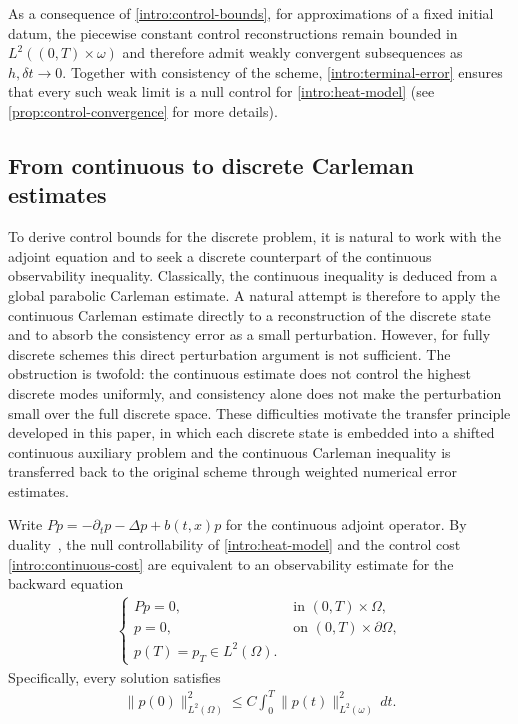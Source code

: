 \documentclass[print,wide,eng]{draft}
\begin{document}
As a consequence of \cref{intro:control-bounds}, for approximations of a fixed initial datum, the piecewise constant control reconstructions remain bounded in $L^2((0,T)\times\omega)$ and therefore admit weakly convergent subsequences as $h,\delta t\to0$.
Together with consistency of the scheme, \cref{intro:terminal-error} ensures that every such weak limit is a null control for \cref{intro:heat-model} (see \cref{prop:control-convergence} for more details).



\subsection{From continuous to discrete Carleman estimates}\label{intro:transfer}

To derive control bounds for the discrete problem, it is natural to work with the adjoint equation and to seek a discrete counterpart of the continuous observability inequality. Classically, the continuous inequality is deduced from a global parabolic Carleman estimate. A natural attempt is therefore to apply the continuous Carleman estimate directly to a reconstruction of the discrete state and to absorb the consistency error as a small perturbation. However, for fully discrete schemes this direct perturbation argument is not sufficient. The obstruction is twofold: the continuous estimate does not control the highest discrete modes uniformly, and consistency alone does not make the perturbation small over the full discrete space. These difficulties motivate the transfer principle developed in this paper, in which each discrete state is embedded into a shifted continuous auxiliary problem and the continuous Carleman inequality is transferred back to the original scheme through weighted numerical error estimates.

Write $Pp=-\partial_t p-\Delta p+b(t,x)p$ for the continuous adjoint operator. By duality~\cite{Lions1988}, the null controllability of \eqref{intro:heat-model} and the control cost \cref{intro:continuous-cost} are equivalent to an observability estimate for the backward equation
%
\begin{align}\label{intro:continuous-adjoint}
\begin{cases}
Pp=0,& \text{ in }(0,T)\times\Omega,\\
p=0,& \text{ on }(0,T)\times\partial\Omega,\\
p(T)=p_T\in L^2(\Omega).
\end{cases}
\end{align}
%
Specifically, every solution satisfies
%
\begin{align}\label{intro:continuous-observability}
\|p(0)\|_{L^2(\Omega)}^2
\leq C\int_0^T\|p(t)\|_{L^2(\omega)}^2\,dt.
\end{align}
%
\end{document}

